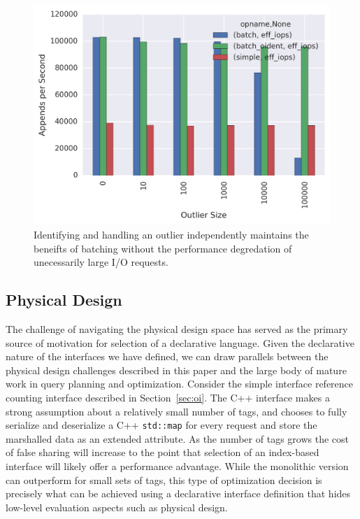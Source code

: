 \begin{figure}
\centering
\includegraphics[width=1.0\linewidth]{batching-outlier-detect.png}
\caption{Identifying and handling an outlier independently maintains the
beneifts of batching without the performance degredation of unecessarily
large I/O requests.}
\label{fig:batching-outlier}
\end{figure}

\subsection{Physical Design}

The challenge of navigating the physical design space
has served as the primary source of motivation for selection of a declarative
language. Given the declarative nature of the interfaces we have defined,
we can draw parallels between the physical design challenges described in this
paper and the
large body of mature work in query planning and optimization. Consider the
simple interface reference counting interface described in
Section~\ref{sec:oi}.  The C++ interface makes a strong assumption about a
relatively small number of tags, and chooses to fully serialize and
deserialize a C++ \texttt{std::map} for every request and store the marshalled
data as an extended attribute.  As the number of tags grows the cost of false
sharing will increase to the point that selection of an index-based interface
will likely offer a performance advantage. While the monolithic version can
outperform for small sets of tags, this type of optimization decision is
precisely what can be achieved using a declarative interface definition that
hides low-level evaluation aspects such as physical design.

